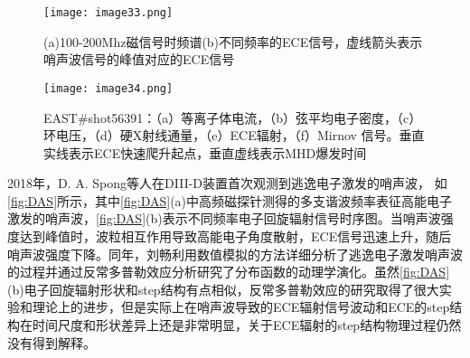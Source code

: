 \begin{figure}[ht]
\centering
\texttt{[image: image33.png]}
\caption{\label{fig:DAS}(a)100-200Mhz磁信号时频谱(b)不同频率的ECE信号，虚线箭头表示哨声波信号的峰值对应的ECE信号\cite{RN975}}
\end{figure}

\begin{figure}[ht]
\centering
\texttt{[image: image34.png]}
\caption{\label{fig:LEZ}EAST\#shot56391：（a）等离子体电流，（b）弦平均电子密度，（c）环电压，（d）硬X射线通量，（e）ECE辐射，（f）Mirnov 信号。垂直实线表示ECE快速爬升起点，垂直虚线表示MHD爆发时间\cite{RN1859}}
\end{figure}
\par 2018年，D. A. Spong等人在DIII-D装置首次观测到逃逸电子激发的哨声波\cite{RN975}， 如\autoref{fig:DAS}所示，其中\autoref{fig:DAS}(a)中高频磁探针测得的多支谐波频率表征高能电子激发的哨声波，\autoref{fig:DAS}(b)表示不同频率电子回旋辐射信号时序图。当哨声波强度达到峰值时，波粒相互作用导致高能电子角度散射，ECE信号迅速上升，随后哨声波强度下降。同年，刘畅利用数值模拟的方法详细分析了逃逸电子激发哨声波的过程并通过反常多普勒效应分析研究了分布函数的动理学演化\cite{RN1815}。虽然\autoref{fig:DAS}(b)电子回旋辐射形状和step结构有点相似，反常多普勒效应的研究取得了很大实验和理论上的进步，但是实际上在哨声波导致的ECE辐射信号波动和ECE的step结构在时间尺度和形状差异上还是非常明显，关于ECE辐射的step结构物理过程仍然没有得到解释。




